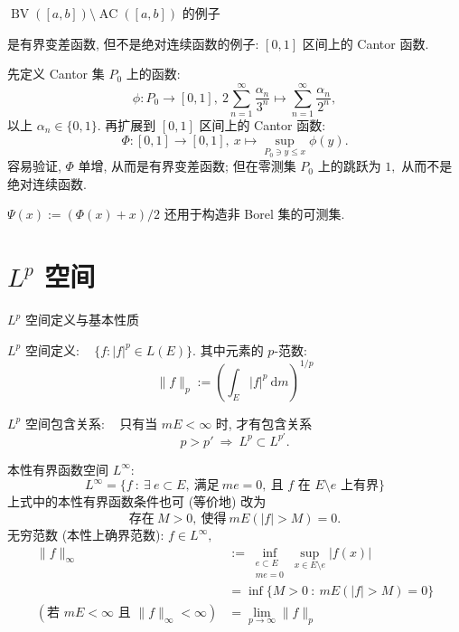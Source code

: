 
\begin{frame}{$\operatorname{BV}([a, b]) \setminus \operatorname{AC}([a, b])$ 的例子}

是有界变差函数, 但不是绝对连续函数的例子:
\pause
$[0, 1]$ 区间上的 Cantor 函数.
\pause

先定义 Cantor 集 $P_0$ 上的函数:
\[
\phi: P_0 \longrightarrow [0, 1], ~ 2 \sum_{n=1}^{\infty} \frac{\alpha_n}{3^n} \mapsto \sum_{n=1}^{\infty} \frac{\alpha_n}{2^n},
\]
以上 $\alpha_n \in \{0, 1\}.$
\pause
再扩展到 $[0, 1]$ 区间上的 Cantor 函数:
\[
\Phi: [0, 1] \longrightarrow [0, 1], ~ x \mapsto \sup_{P_0 \ni y \leqslant x} \phi(y).
\]
\pause
容易验证, $\Phi$ 单增, 从而是有界变差函数; 但在零测集 $P_0$ 上的跳跃为 $1,$ 从而不是绝对连续函数.

\begin{attnblock}
$\Psi(x) := (\Phi(x) + x) / 2$ 还用于构造非 Borel 集的可测集.
\end{attnblock}

\end{frame}


\section[$L^p$ 空间]{$L^p$ 空间}


\begin{frame}{$L^p$ 空间定义与基本性质}

$L^p$ 空间定义: ~ $\{ f : |f|^p \in L(E) \}.$ 其中元素的 $p$-范数:
\[
\lVert f \rVert_p := \left( \int_E |f|^p ~ \mathrm{d} m \right)^{1/p}
\]

\pause
\vspace{0.5em}

$L^p$ 空间包含关系: ~ \alert{只有当 $m E < \infty$ 时}, 才有包含关系
\[
p > p' ~ \Longrightarrow ~ L^p \subset L^{p'}.
\]

\pause
\vspace{0.5em}

本性有界函数空间 $L^{\infty}:$
\[
L^{\infty} = \{ f ~:~ \exists ~ e \subset E, ~ \text{满足} ~ me = 0, ~ \text{且 $f$ 在 $E \setminus e$ 上有界} \}
\]
上式中的本性有界函数条件也可 (等价地) 改为
\[
\text{存在} ~ M > 0, ~ \text{使得} ~ m E(|f| > M) = 0.
\]
\pause
无穷范数 (本性上确界范数): $f \in L^{\infty},$
\begin{align*}
\lVert f \rVert_{\infty} & := \inf_{\substack{e \subset E\\me = 0}} \sup_{x \in E \setminus e} |f(x)| \\
& = \inf \{ M > 0 ~:~ m E(|f| > M) = 0 \} \\
(\text{若 $m E < \infty$ 且 $\lVert f \rVert_{\infty} < \infty$}) & = \lim_{p\to\infty} \lVert f \rVert_p
\end{align*}

\end{frame}

